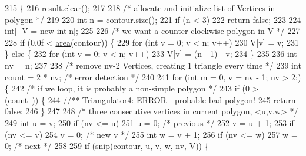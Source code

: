 \begin{DoxyCode}
215                                                                  \{
216         result.clear();
217         
218         \textcolor{comment}{/* allocate and initialize list of Vertices in polygon */}
219 
220         \textcolor{keywordtype}{int} n = contour.size();
221         \textcolor{keywordflow}{if} (n < 3)
222             \textcolor{keywordflow}{return} \textcolor{keyword}{false};
223 
224         \textcolor{keywordtype}{int}[] V = \textcolor{keyword}{new} \textcolor{keywordtype}{int}[n];
225 
226         \textcolor{comment}{/* we want a counter-clockwise polygon in V */}
227 
228         \textcolor{keywordflow}{if} (0.0f < \mbox{\hyperlink{classorg_1_1newdawn_1_1slick_1_1geom_1_1_basic_triangulator_ade8b558b3ec5771bf8313f841d9aba9a}{area}}(contour)) \{
229             \textcolor{keywordflow}{for} (\textcolor{keywordtype}{int} v = 0; v < n; v++)
230                 V[v] = v;
231         \} \textcolor{keywordflow}{else} \{
232             \textcolor{keywordflow}{for} (\textcolor{keywordtype}{int} v = 0; v < n; v++)
233                 V[v] = (n - 1) - v;
234         \}
235 
236         \textcolor{keywordtype}{int} nv = n;
237 
238         \textcolor{comment}{/*  remove nv-2 Vertices, creating 1 triangle every time */}
239         \textcolor{keywordtype}{int} count = 2 * nv; \textcolor{comment}{/* error detection */}
240 
241         \textcolor{keywordflow}{for} (\textcolor{keywordtype}{int} m = 0, v = nv - 1; nv > 2;) \{
242             \textcolor{comment}{/* if we loop, it is probably a non-simple polygon */}
243             \textcolor{keywordflow}{if} (0 >= (count--)) \{
244                 \textcolor{comment}{//** Triangulator4: ERROR - probable bad polygon!}
245                 \textcolor{keywordflow}{return} \textcolor{keyword}{false};
246             \}
247 
248             \textcolor{comment}{/* three consecutive vertices in current polygon, <u,v,w> */}
249             \textcolor{keywordtype}{int} u = v;
250             \textcolor{keywordflow}{if} (nv <= u)
251                 u = 0; \textcolor{comment}{/* previous */}
252             v = u + 1;
253             \textcolor{keywordflow}{if} (nv <= v)
254                 v = 0; \textcolor{comment}{/* new v    */}
255             \textcolor{keywordtype}{int} w = v + 1;
256             \textcolor{keywordflow}{if} (nv <= w)
257                 w = 0; \textcolor{comment}{/* next     */}
258 
259             \textcolor{keywordflow}{if} (\mbox{\hyperlink{classorg_1_1newdawn_1_1slick_1_1geom_1_1_basic_triangulator_a7b9644fd18ac42ce0f128db555d77606}{snip}}(contour, u, v, w, nv, V)) \{

\end{DoxyCode}
